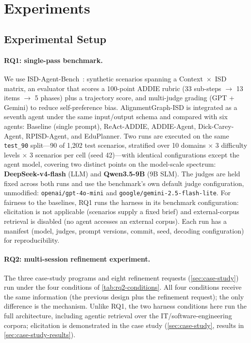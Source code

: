 \section{Experiments}
\label{sec:experiments}

\subsection{Experimental Setup}
\label{sec:setup}

\paragraph{RQ1: single-pass benchmark.}
We use ISD-Agent-Bench~\cite{isdagentbench}: synthetic scenarios spanning a Context~$\times$~ISD matrix, an evaluator that scores a 100-point ADDIE rubric (33 sub-steps $\rightarrow$ 13 items $\rightarrow$ 5 phases) plus a trajectory score, and multi-judge grading (GPT + Gemini) to reduce self-preference bias. AlignmentGraph-ISD is integrated as a seventh agent under the same input/output schema and compared with six agents: Baseline (single prompt), ReAct-ADDIE, ADDIE-Agent, Dick-Carey-Agent, RPISD-Agent, and EduPlanner. Two runs are executed on the same \texttt{test\_90} split---90 of 1{,}202 test scenarios, stratified over 10 domains $\times$ 3 difficulty levels $\times$ 3 scenarios per cell (seed 42)---with identical configurations except the agent model, covering two distinct points on the model-scale spectrum: \textbf{DeepSeek-v4-flash} (LLM) and \textbf{Qwen3.5-9B} (9B SLM). The judges are held fixed across both runs and use the benchmark's own default judge configuration, unmodified: \texttt{openai/gpt-4o-mini} and \texttt{google/gemini-2.5-flash-lite}. For fairness to the baselines, RQ1 runs the harness in its benchmark configuration: elicitation is not applicable (scenarios supply a fixed brief) and external-corpus retrieval is disabled (no agent accesses an external corpus). Each run has a manifest (model, judges, prompt versions, commit, seed, decoding configuration) for reproducibility.

\paragraph{RQ2: multi-session refinement experiment.}
The three case-study programs and eight refinement requests (\cref{sec:case-study}) run under the four conditions of \cref{tab:rq2-conditions}. All four conditions receive the same information (the previous design plus the refinement request); the only difference is the mechanism. Unlike RQ1, the two harness conditions here run the full architecture, including agentic retrieval over the IT/software-engineering corpora; elicitation is demonstrated in the case study (\cref{sec:case-study}, results in \cref{sec:case-study-results}).

